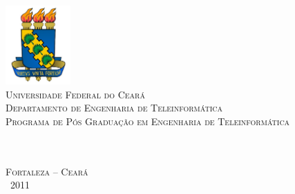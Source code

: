 \thispagestyle{empty}%

\begin{center}
    \includegraphics[width=2.5cm,bb=0 0 382 465]{figs/ufc.jpg} \\%
    \textsc{
    Universidade Federal do Cear\'{a} \\%
    Departamento de Engenharia de Teleinform\'{a}tica \\%
    Programa de P\'{o}s Gradua\c{c}\~{a}o em Engenharia de Teleinform\'{a}tica\\
    }
    \vspace{2.5 cm}%
    {                \textbf{\autor}
    } \\%

    \null\vfill%
    \vspace{.2cm}%
        {\Large         \textbf{\titulo}\\}



    \null\vfill%
    \vspace{1 cm}%
    {\normalsize    \textsc{Fortaleza -- Cear\'{a} \\%
                            \monthname~2011 }}
\end{center}
